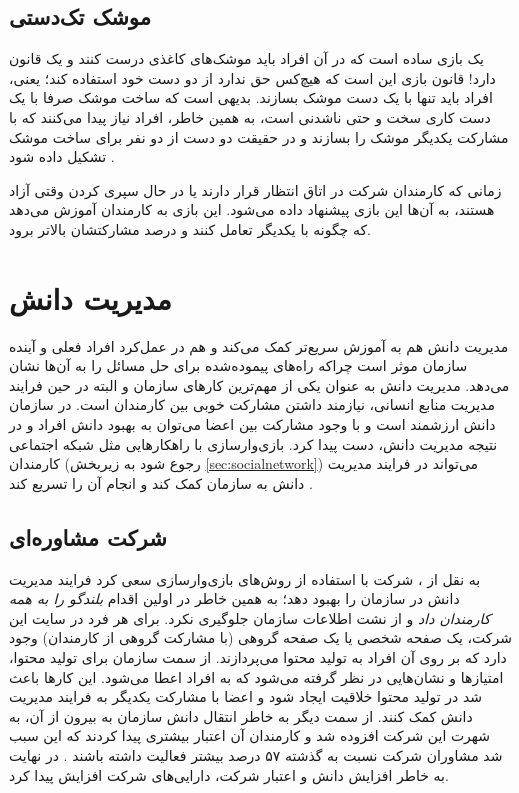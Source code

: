 \subsection{موشک تک‌دستی}
یک بازی ساده است که در آن افراد باید موشک‌های کاغذی درست کنند و یک قانون دارد! قانون بازی این است که هیچ‌کس حق ندارد از دو دست خود استفاده کند؛ یعنی، افراد باید تنها با یک دست موشک بسازند. بدیهی است که ساخت موشک صرفا با یک دست کاری سخت و حتی ناشدنی است، به همین خاطر، افراد نیاز پیدا می‌کنند که با مشارکت یکدیگر موشک را بسازند و در حقیقت دو دست از دو نفر برای ساخت موشک تشکیل داده شود \cite{tedx}.

زمانی که کارمندان شرکت در اتاق انتظار قرار دارند یا در حال سپری کردن وقتی آزاد هستند، به آن‌ها این بازی پیشنهاد داده می‌شود. این بازی به کارمندان آموزش می‌دهد که چگونه با یکدیگر تعامل کنند و درصد مشارکتشان بالاتر برود.
\section{مدیریت دانش}
مدیریت دانش هم به آموزش سریع‌تر کمک می‌کند و هم در عمل‌کرد افراد فعلی و آینده سازمان موثر است چراکه راه‌های پیموده‌شده برای حل مسائل را به آن‌ها نشان می‌دهد. مدیریت دانش به عنوان یکی از مهم‌ترین کارهای سازمان و البته در حین فرایند مدیریت منابع انسانی، نیازمند داشتن مشارکت خوبی بین کارمندان است. در سازمان دانش ارزشمند است \cite{kmanagement} و با وجود مشارکت بین اعضا می‌توان به بهبود دانش افراد و در نتیجه مدیریت دانش، دست پیدا کرد. بازی‌وارسازی با راهکارهایی مثل شبکه اجتماعی کارمندان (رجوع شود به زیربخش \ref{sec:socialnetwork}) می‌تواند در فرایند مدیریت دانش به سازمان کمک کند و انجام آن را تسریع کند \cite{amiriamin}.
\subsection{شرکت مشاوره‌ای }
به نقل از \cite{modiran}، شرکت  با استفاده از روش‌های بازی‌وارسازی سعی کرد فرایند مدیریت دانش در سازمان را بهبود دهد؛ به همین خاطر در اولین اقدام \emph{بلندگو را به همه کارمندان داد} و از نشت اطلاعات سازمان جلوگیری نکرد. برای هر فرد در سایت این شرکت، یک صفحه شخصی یا یک صفحه گروهی (با مشارکت گروهی از کارمندان) وجود دارد که بر روی آن افراد به تولید محتوا می‌پردازند. از سمت سازمان برای تولید محتوا، امتیازها و نشان‌هایی در نظر گرفته می‌شود که به افراد اعطا می‌شود. این کارها باعث شد در تولید محتوا خلاقیت ایجاد شود و اعضا با مشارکت یکدیگر به فرایند مدیریت دانش کمک کنند. از سمت دیگر به خاطر انتقال دانش سازمان به بیرون از آن، به شهرت این شرکت افزوده شد و کارمندان آن اعتبار بیشتری پیدا کردند که این سبب شد مشاوران شرکت نسبت به گذشته ۵۷ درصد بیشتر فعالیت داشته باشند \cite{bluewolf}. در نهایت به خاطر افزایش دانش و اعتبار شرکت، دارایی‌های شرکت افزایش پیدا کرد.

